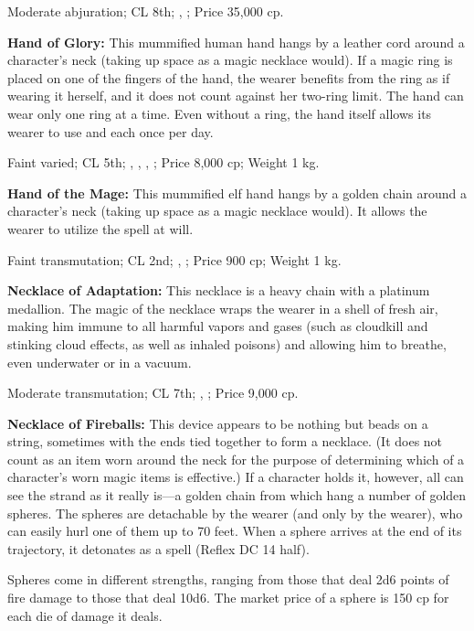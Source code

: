 Moderate abjuration; CL 8th; , ; Price 35,000 cp.

\textbf{Hand of Glory:} This mummified human hand hangs by a leather cord around a character's neck (taking up space as a magic necklace would). If a magic ring is placed on one of the fingers of the hand, the wearer benefits from the ring as if wearing it herself, and it does not count against her two-ring limit. The hand can wear only one ring at a time. Even without a ring, the hand itself allows its wearer to use  and  each once per day.

Faint varied; CL 5th; , , , ; Price 8,000 cp; Weight 1 kg.

\textbf{Hand of the Mage:} This mummified elf hand hangs by a golden chain around a character's neck (taking up space as a magic necklace would). It allows the wearer to utilize the spell  at will.

Faint transmutation; CL 2nd; , ; Price 900 cp; Weight 1 kg.

\textbf{Necklace of Adaptation:} This necklace is a heavy chain with a platinum medallion. The magic of the necklace wraps the wearer in a shell of fresh air, making him immune to all harmful vapors and gases (such as cloudkill and stinking cloud effects, as well as inhaled poisons) and allowing him to breathe, even underwater or in a vacuum.

Moderate transmutation; CL 7th; , ; Price 9,000 cp.

\textbf{Necklace of Fireballs:} This device appears to be nothing but beads on a string, sometimes with the ends tied together to form a necklace. (It does not count as an item worn around the neck for the purpose of determining which of a character's worn magic items is effective.) If a character holds it, however, all can see the strand as it really is---a golden chain from which hang a number of golden spheres. The spheres are detachable by the wearer (and only by the wearer), who can easily hurl one of them up to 70 feet. When a sphere arrives at the end of its trajectory, it detonates as a  spell (Reflex DC 14 half).

Spheres come in different strengths, ranging from those that deal 2d6 points of fire damage to those that deal 10d6. The market price of a sphere is 150 cp for each die of damage it deals.

